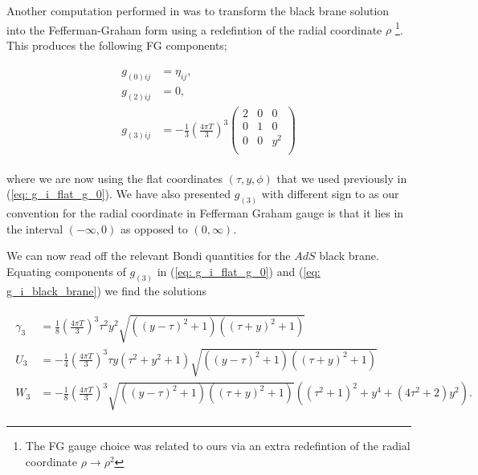 \documentclass[a4paper,11pt]{article}
\numberwithin{equation}{section}
\begin{document}
Another computation performed in \cite{Kanitscheider:2009as} was to transform the black brane solution into the Fefferman-Graham form using a redefintion of the radial coordinate $\rho$ \footnote{The FG gauge choice \cite{Kanitscheider:2009as} was related to ours via an extra redefintion of the radial coordinate $\rho \rightarrow \rho^{2}$}. This produces the following FG components; 

\begin{align}
\begin{split} \label{eq: g_i_black_brane}
g_{(0)ij}&=\eta_{ij}, \\
g_{(2)ij}&=0, \\
g_{(3)ij}&=-\frac{1}{3} \left( \frac{4\pi T}{3} \right)^3 \left( \begin{array}{ccc} 
2 & 0 & 0 \\
0 & 1 & 0 \\
0 & 0 & y^2 \\
\end{array} \right)
\end{split}
\end{align}

\noindent where we are now using the flat coordinates $(\tau, y, \phi)$ that we used previously in (\ref{eq: g_i_flat_g_0}). We have also presented $g_{(3)}$ with different sign to \cite{Kanitscheider:2009as} as our convention for the radial coordinate in Fefferman Graham gauge is that it lies in the interval $( - \infty, 0)$ as opposed to $(0, \infty)$. \par

We can now read off the relevant Bondi quantities for the $AdS$ black brane. Equating components of $g_{(3)}$ in (\ref{eq: g_i_flat_g_0}) and (\ref{eq: g_i_black_brane}) we find the solutions 

\begin{align}
\begin{split}
\gamma_3&=\frac{1}{8} \left( \frac{4\pi T}{3} \right)^3 \tau ^2 y^2 \sqrt{\left((y-\tau )^2+1\right) \left((\tau +y)^2+1\right)} \\
U_3&=- \frac{1}{4} \left( \frac{4\pi T}{3} \right)^3 \tau  y \left(\tau ^2+y^2+1\right) \sqrt{\left((y-\tau )^2+1\right) \left((\tau +y)^2+1\right)} \\
W_3 &= - \frac{1}{8} \left( \frac{4\pi T}{3} \right)^3 \sqrt{\left((y-\tau )^2+1\right) \left((\tau +y)^2+1\right)} \left(\left(\tau ^2+1\right)^2+y^4+\left(4 \tau ^2+2\right) y^2\right).
\end{split}
\end{align}
\end{document}

